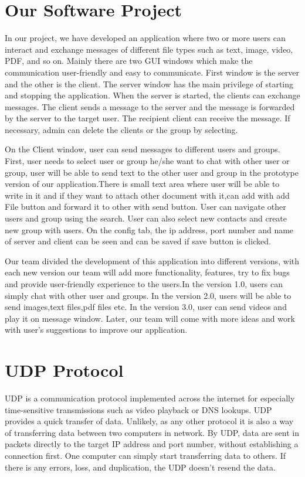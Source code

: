 \section{Our Software Project}\label{sec:our-software-project}
In our project, we have developed an application where two or more users can interact and
exchange messages of different file types such as text, image, video, PDF, and so on.
Mainly there are two GUI windows which make the communication user-friendly and easy to
communicate.
First window is the server and the other is the client.
The server window has the main privilege of starting and stopping the application.
When the server is started, the clients can exchange messages.
The client sends a message to the server and the message is forwarded by the server to the
target user.
The recipient client can receive the message.
If necessary, admin can delete the clients or the group by selecting.
\medskip

\noindent
On the Client window, user can send messages to different users and groups.
First, user needs to select user or group he/she want to chat with other user or group,
user will be able to send text to the other user and group in the prototype version of our
application.There is small text area where user will be able to write in it and if they want
to attach other document with it,can add with add File button and forward it to other with send
button.
User can navigate other users and group using the search.
User can also select new contacts and create new group with users.
On the config tab, the ip address, port number and name of server and client can be seen and
can be saved if save button is clicked.
\medskip

\noindent
Our team divided the development of this application into different versions, with each new
version our team will add more functionality, features, try to fix bugs and provide
user-friendly experience to the users.In the version 1.0, users can simply chat with other user
and groups.
In the version 2.0, users will be able to send images,text files,pdf files etc.
In the version 3.0, user can send videos and play it on message window.
Later, our team will come with more ideas and work with user's suggestions to improve our
application.
\medskip

\noindent


\section{UDP Protocol}\label{sec:udp protocol}
UDP is a communication protocol implemented across the internet for especially time-sensitive
transmissions such as video playback or DNS lookups.
UDP provides a quick transfer of data.
Unlikely, as any other protocol it is also a way of transferring data between two computers in
network.
By UDP, data are sent in packets directly to the target IP address and port number,
without establishing a connection first.
One computer can simply start transferring data to others.
If there is any errors, loss, and duplication, the UDP doesn't resend the data.



